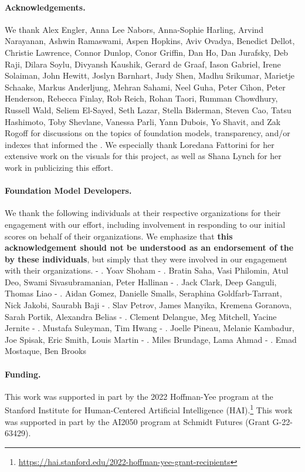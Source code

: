 \paragraph{Acknowledgements.}
We thank Alex Engler, Anna Lee Nabors, Anna-Sophie Harling, Arvind Narayanan, Ashwin Ramaswami, Aspen Hopkins, Aviv Ovadya, Benedict Dellot, Christie Lawrence, Connor Dunlop, Conor Griffin, Dan Ho, Dan Jurafsky, Deb Raji, Dilara Soylu, Divyansh Kaushik, Gerard de Graaf, Iason Gabriel, Irene Solaiman, John Hewitt, Joslyn Barnhart, Judy Shen, Madhu Srikumar, Marietje Schaake, Markus Anderljung, Mehran Sahami, Neel Guha, Peter Cihon, Peter Henderson, Rebecca Finlay, Rob Reich, Rohan Taori, Rumman Chowdhury, Russell Wald, Seliem El-Sayed, Seth Lazar, Stella Biderman, Steven Cao, Tatsu Hashimoto, Toby Shevlane, Vanessa Parli, Yann Dubois, Yo Shavit, and Zak Rogoff for discussions on the topics of foundation models, transparency, and/or indexes that informed the \projectname. 
We especially thank Loredana Fattorini for her extensive work on the visuals for this project, as well as Shana Lynch for her work in publicizing this effort.

\paragraph{Foundation Model Developers.}
We thank the following individuals at their respective organizations for their engagement with our effort, including involvement in responding to our initial scores on behalf of their organizations. 
We emphasize that \textbf{this acknowledgement should not be understood as an endorsement of the \projectname by these individuals}, but simply that they were involved in our engagement with their organizations.
-  \aitwentyone. Yoav Shoham
-  \amazon. Bratin Saha, Vasi Philomin, Atul Deo, Swami Sivasubramanian, Peter Hallinan
-  \anthropic. Jack Clark, Deep Ganguli, Thomas Liao
-  \cohere. Aidan Gomez, Danielle Smalls, Seraphina Goldfarb-Tarrant, Nick Jakobi, Saurabh Baji
-  \google. Slav Petrov, James Manyika, Kremena Goranova, Sarah Portik, Alexandra Belias
-  \huggingface. Clement Delangue, Meg Mitchell, Yacine Jernite
-  \inflection. Mustafa Suleyman, Tim Hwang
-  \meta. Joelle Pineau, Melanie Kambadur, Joe Spisak, Eric Smith, Louis Martin
-  \openai. Miles Brundage, Lama Ahmad
-  \stability. Emad Mostaque, Ben Brooks

\paragraph{Funding.}
This work was supported in part by the 2022 Hoffman-Yee program at the Stanford Institute for Human-Centered Artificial Intelligence (HAI).\footnote{\url{https://hai.stanford.edu/2022-hoffman-yee-grant-recipients}}
This work was supported in part by the AI2050 program at Schmidt Futures (Grant G-22-63429).

